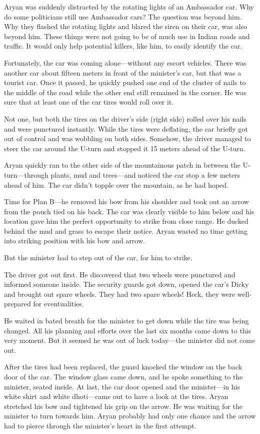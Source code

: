 Aryan was suddenly distracted by the rotating lights of an Ambassador car. Why
do some politicians still use Ambassador cars? The question was beyond him. Why
they flashed the rotating lights and blared the siren on their car, was also
beyond him. These things were not going to be of much use in Indian roads and
traffic. It would only help potential killers, like him, to easily identify the
car.

Fortunately, the car was coming alone—without any escort vehicles. There was
another car about fifteen meters in front of the minister's car, but that was a
tourist car. Once it passed, he quickly pushed one end of the cluster of nails
to the middle of the road while the other end still remained in the corner. He
was sure that at least one of the car tires would roll over it.

Not one, but both the tires on the driver's side (right side) rolled over his
nails and were punctured instantly. While the tires were deflating, the car
briefly got out of control and was wobbling on both sides. Somehow, the driver
managed to steer the car around the U-turn and stopped it 15 meters ahead of the
U-turn.

Aryan quickly ran to the other side of the mountainous patch in between the
U-turn—through plants, mud and trees—and noticed the car stop a few meters
ahead of him. The car didn't topple over the mountain, as he had hoped.

Time for Plan B—he removed his bow from his shoulder and took out an arrow
from the pouch tied on his back. The car was clearly visible to him below and
his location gave him the perfect opportunity to strike from close range. He
ducked behind the mud and grass to escape their notice. Aryan wasted no time
getting into striking position with his bow and arrow.

But the minister had to step out of the car, for him to strike.

The driver got out first. He discovered that two wheels were punctured and
informed someone inside. The security guards got down, opened the car's Dicky
and brought out spare wheels. They had two spare wheels! Heck, they were
well-prepared for eventualities.

He waited in bated breath for the minister to get down while the tire was being
changed. All his planning and efforts over the last six months came down to this
very moment. But it seemed he was out of luck today—the minister did not come
out.

After the tires had been replaced, the guard knocked the window on the back door
of the car. The window glass came down, and he spoke something to the minister,
seated inside. At last, the car door opened and the minister—in his white
shirt and white dhoti—came out to have a look at the tires. Aryan stretched
his bow and tightened his grip on the arrow. He was waiting for the minister to
turn towards him. Aryan probably had only one chance and the arrow had to pierce
through the minister's heart in the first attempt.

